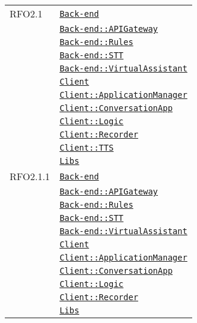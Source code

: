 \begin{longtable}{|>{\centering}m{3cm}|m{10cm}<{\centering}|}
RFO2.1 & \hyperref[Back-end]{\texttt{Back-end}}\\
& \hyperref[Back-end::APIGateway]{\texttt{Back-end::APIGateway}}\\
& \hyperref[Back-end::Rules]{\texttt{Back-end::Rules}}\\
& \hyperref[Back-end::STT]{\texttt{Back-end::STT}}\\
& \hyperref[Back-end::VirtualAssistant]{\texttt{Back-end::VirtualAssistant}}\\
& \hyperref[Client]{\texttt{Client}}\\
& \hyperref[Client::ApplicationManager]{\texttt{Client::ApplicationManager}}\\
& \hyperref[Client::ConversationApp]{\texttt{Client::ConversationApp}}\\
& \hyperref[Client::Logic]{\texttt{Client::Logic}}\\
& \hyperref[Client::Recorder]{\texttt{Client::Recorder}}\\
& \hyperref[Client::TTS]{\texttt{Client::TTS}}\\
& \hyperref[Libs]{\texttt{Libs}}\\ \hline

RFO2.1.1 & \hyperref[Back-end]{\texttt{Back-end}}\\
& \hyperref[Back-end::APIGateway]{\texttt{Back-end::APIGateway}}\\
& \hyperref[Back-end::Rules]{\texttt{Back-end::Rules}}\\
& \hyperref[Back-end::STT]{\texttt{Back-end::STT}}\\
& \hyperref[Back-end::VirtualAssistant]{\texttt{Back-end::VirtualAssistant}}\\
& \hyperref[Client]{\texttt{Client}}\\
& \hyperref[Client::ApplicationManager]{\texttt{Client::ApplicationManager}}\\
& \hyperref[Client::ConversationApp]{\texttt{Client::ConversationApp}}\\
& \hyperref[Client::Logic]{\texttt{Client::Logic}}\\
& \hyperref[Client::Recorder]{\texttt{Client::Recorder}}\\
& \hyperref[Libs]{\texttt{Libs}}\\ \hline


\end{longtable}
